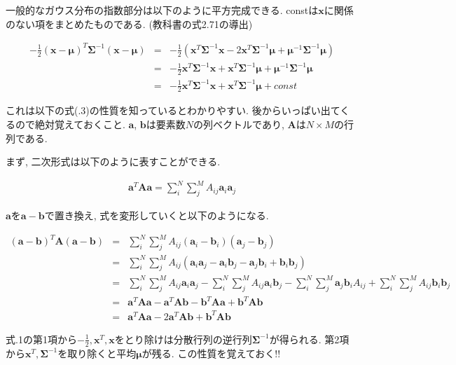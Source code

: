 一般的なガウス分布の指数部分は以下のように平方完成できる. constは$\bm{x}$に関係のない項をまとめたものである. (教科書の式2.71の導出)

\begin{eqnarray}
    -\frac{1}{2}(\bm{x} - \bm{\mu})^{T}\bm{\Sigma}^{-1}(\bm{x} - \bm{\mu}) &=& -\frac{1}{2}(\bm{x}^{T}\bm{\Sigma}^{-1}\bm{x} - 2\bm{x}^{T}\bm{\Sigma}^{-1}\bm{\mu} + \bm{\mu}^{-1}\bm{\Sigma}^{-1}\bm{\mu}) \nonumber \\
    &=& -\frac{1}{2}\bm{x}^{T}\bm{\Sigma}^{-1}\bm{x} + \bm{x}^{T}\bm{\Sigma}^{-1}\bm{\mu} + \bm{\mu}^{-1}\bm{\Sigma}^{-1}\bm{\mu} \nonumber \\
    &=& -\frac{1}{2}\bm{x}^{T}\bm{\Sigma}^{-1}\bm{x} + \bm{x}^{T}\bm{\Sigma}^{-1}\bm{\mu} + const
\end{eqnarray}

これは以下の式(.3)の性質を知っているとわかりやすい. 後からいっぱい出てくるので絶対覚えておくこと. $\bm{a}$, $\bm{b}$は要素数$N$の列ベクトルであり, $\bm{A}$は$N \times M$の行列である.

まず, 二次形式は以下のように表すことができる.

\begin{eqnarray}
    \bm{a}^T\bm{A}\bm{a} = \sum^{N}_{i}\sum^{M}_j A_{ij} \bm{a}_i \bm{a}_j
\end{eqnarray}

\newpage

$\bm{a}$を$\bm{a} - \bm{b}$で置き換え, 式を変形していくと以下のようになる.

\begin{eqnarray}
    (\bm{a} - \bm{b})^T\bm{A}(\bm{a} - \bm{b}) &=& \sum^{N}_i\sum^{M}_j A_{ij}(\bm{a}_i - \bm{b}_i)(\bm{a}_j - \bm{b}_j) \nonumber \\
    &=& \sum^{N}_i\sum^{M}_j A_{ij} (\bm{a}_i \bm{a}_j - \bm{a}_i \bm{b}_j - \bm{a}_j \bm{b}_i + \bm{b}_i \bm{b}_j) \nonumber \\
    &=& \sum^{N}_i\sum^{M}_j A_{ij}\bm{a}_i\bm{a}_j - \sum^{N}_i\sum^{M}_j A_{ij}\bm{a}_i\bm{b}_j - \sum^{N}_i\sum^{M}_j\bm{a}_j\bm{b}_i A_{ij} + \sum^{N}_i\sum^{M}_j A_{ij} \bm{b}_i\bm{b}_j \nonumber \\
    &=& \bm{a}^T\bm{A}\bm{a} - \bm{a}^T\bm{A}\bm{b} - \bm{b}^T\bm{A}\bm{a} + \bm{b}^T\bm{A}\bm{b} \nonumber \\
    &=& \bm{a}^T\bm{A}\bm{a} - 2\bm{a}^T\bm{A}\bm{b} + \bm{b}^T\bm{A}\bm{b}
\end{eqnarray}

式.1の第1項から$-\frac{1}{2}, \bm{x}^T, \bm{x}$をとり除けは分散行列の逆行列$\bm{\Sigma}^{-1}$が得られる. 第2項から$\bm{x}^T, \bm{\Sigma}^{-1}$を取り除くと平均$\bm{\mu}$が残る. この性質を覚えておく!!

